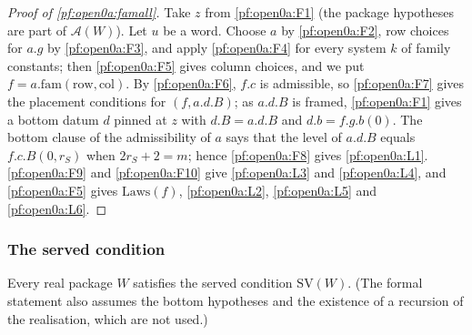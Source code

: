 \begin{proof}[Proof of \cref{pf:open0a:famall}]
Take $z$ from \ref{pf:open0a:F1} (the package hypotheses are part of $\mathcal A(W)$). Let $u$ be a word. Choose $a$ by
\ref{pf:open0a:F2}, row choices for $a.g$ by \ref{pf:open0a:F3}, and apply \ref{pf:open0a:F4} for every system $k$ of
family constants; then \ref{pf:open0a:F5} gives column choices, and we put $f=a.\mathrm{fam}(\mathrm{row},\mathrm{col})$.
By \ref{pf:open0a:F6}, $f.c$ is admissible, so \ref{pf:open0a:F7} gives the placement conditions for $(f,a.d.B)$; as
$a.d.B$ is framed, \ref{pf:open0a:F1} gives a bottom datum $d$ pinned at $z$ with $d.B=a.d.B$ and $d.b=f.g.b(0)$. The
bottom clause of the admissibility of $a$ says that the level of $a.d.B$ equals $f.c.B(0,r_S)$ when $2r_S+2=m$; hence
\ref{pf:open0a:F8} gives \ref{pf:open0a:L1}. \ref{pf:open0a:F9} and \ref{pf:open0a:F10} give \ref{pf:open0a:L3} and
\ref{pf:open0a:L4}, and \ref{pf:open0a:F5} gives $\mathrm{Laws}(f)$, \ref{pf:open0a:L2}, \ref{pf:open0a:L5} and
\ref{pf:open0a:L6}.
\end{proof}

\subsubsection{The served condition}

\begin{lemma}\label{pf:open0a:served}
Every real package $W$ satisfies the served condition $\mathrm{SV}(W)$. (The formal statement also assumes the bottom
hypotheses and the existence of a recursion of the realisation, which are not used.)
\ 
\end{lemma}

